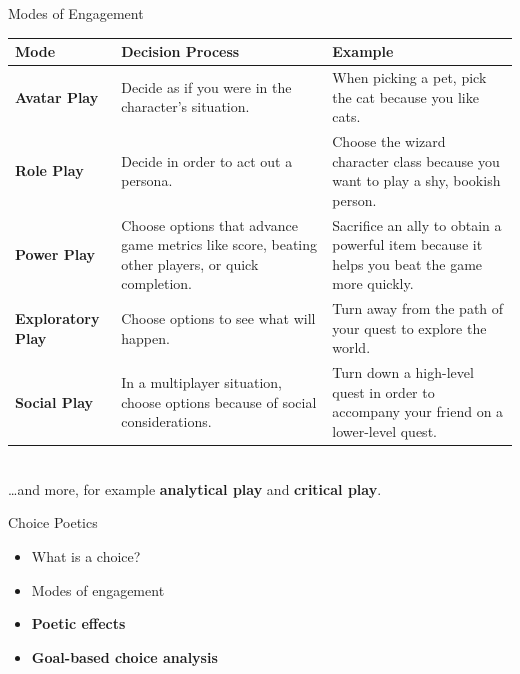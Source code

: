 \documentclass[xcolor=x11names]{beamer}
\begin{document}
\begin{frame}{Modes of Engagement}
\vfill
\centering
\renewcommand*{\arraystretch}{1.5}
\scriptsize
\begin{tabular}{p{6em}p{12em}p{13em}}
\toprule
\textbf{Mode} & \textbf{Decision Process} & \textbf{Example} \\
\midrule
\textbf{Avatar Play} & Decide as if you were in the character's situation. & When picking a pet, pick the cat because you like cats. \\
\textbf{Role Play} & Decide in order to act out a persona. & Choose the wizard character class because you want to play a shy, bookish person. \\
\textbf{Power Play} & Choose options that advance game metrics like score, beating other players, or quick completion. & Sacrifice an ally to obtain a powerful item because it helps you beat the game more quickly. \\
\textbf{Exploratory Play} & Choose options to see what will happen. & Turn away from the path of your quest to explore the world. \\
\textbf{Social Play} & In a multiplayer situation, choose options because of social considerations. & Turn down a high-level quest in order to accompany your friend on a lower-level quest. \\
\bottomrule
\end{tabular} \\ \vspace{1ex}
\ldots and more, for example \textbf{analytical play} and \textbf{critical play}.
\end{frame}

\begin{frame}{Choice Poetics}
  \begin{itemize}\addtolength{\itemsep}{0.5\baselineskip}
      \item What is a choice?
      \item Modes of engagement
      \item \textbf{Poetic effects}
      \item \textbf{Goal-based choice analysis}
  \end{itemize}
\end{frame}
\end{document}
